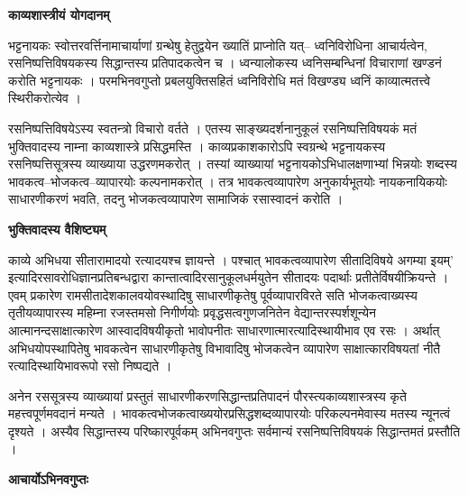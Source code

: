 \documentclass[10pt, a5paper, twoside]{article}
\newcommand{\customparagraph}[1]{
    \noindent \textbf{#1} \par
    \penalty 10000 %
    \vspace{0.1cm plus 0.05cm minus 0.02cm}
    \penalty 10000 %
}
\begin{document}
\customparagraph{\textbf{काव्यशास्त्रीयं योगदानम्}}

भट्टनायकः स्वोत्तरवर्त्तिनामाचार्याणां ग्रन्थेषु हेतुद्वयेन ख्यातिं प्राप्नोति यत्– ध्वनिविरोधिना आचार्यत्वेन, रसनिष्पत्तिविषयकस्य सिद्धान्तस्य प्रतिपादकत्वेन च । ध्वन्यालोकस्य ध्वनिसम्बन्धिनां  विचाराणां खण्डनं करोति भट्टनायकः । परमभिनवगुप्तो प्रबलयुक्तिसहितं ध्वनिविरोधि  मतं विखण्ड्य ध्वनिं काव्यात्मतत्त्वे स्थिरीकरोत्येव ।

रसनिष्पत्तिविषयेऽस्य स्वतन्त्रो विचारो वर्तते । एतस्य साङ्ख्यदर्शनानुकूलं रसनिष्पत्तिविषयकं मतं भुक्तिवादस्य नाम्ना काव्यशास्त्रे प्रसिद्धमस्ति । काव्यप्रकाशकारोऽपि स्वग्रन्थे भट्टनायकस्य रसनिष्पत्तिसूत्रस्य व्याख्याया उद्धरणमकरोत् । तस्यां व्याख्यायां भट्टनायकोऽभिधालक्षणाभ्यां भिन्नयोः शब्दस्य भावकत्व–भोजकत्व–व्यापारयोः कल्पनामकरोत् । तत्र भावकत्वव्यापारेण अनुकार्यभूतयोः नायकनायिकयोः साधारणीकरणं भवति, तदनु भोजकत्वव्यापारेण सामाजिकं  रसास्वादनं करोति ।

\customparagraph{\textbf{भुक्तिवादस्य वैशिष्ट्यम्}}

काव्ये अभिधया सीतारामादयो रत्यादयश्च ज्ञायन्ते । पश्चात् भावकत्वव्यापारेण सीतादिविषये अगम्या इयम्’ इत्यादिरसावरोधिज्ञानप्रतिबन्धद्वारा कान्तात्वादिरसानुकूलधर्मयुतेन सीतादयः पदार्थाः प्रतीतेर्विषयीक्रियन्ते । एवम् प्रकारेण रामसीतादेशकालवयोवस्थादिषु साधारणीकृतेषु पूर्वव्यापारविरते सति भोजकत्वाख्यस्य तृतीयव्यापारस्य महिम्ना रजस्तमसो निगीर्णयोः प्रवृद्धसत्वगुणजनितेन वेद्यान्तरस्पर्शशून्येन आत्मानन्दसाक्षात्कारेण आस्वादविषयीकृतो भावोपनीतः साधारणात्मारत्यादिस्थायीभाव एव रसः । अर्थात् अभिधयोपस्थापितेषु भावकत्वेन साधारणीकृतेषु विभावादिषु भोजकत्वेन व्यापारेण साक्षात्कारविषयतां नीतै रत्यादिस्थायिभावरूपो रसो निष्पद्यते ।

अनेन रससूत्रस्य व्याख्यायां प्रस्तुतं साधारणीकरणसिद्धान्तप्रतिपादनं पौरस्त्यकाव्यशास्त्रस्य कृते महत्त्वपूर्णमवदानं मन्यते । भावकत्वभोजकत्वाख्ययोरप्रसिद्धशब्दव्यापारयोः  परिकल्पनमेवास्य मतस्य न्यूनत्वं दृश्यते । अस्यैव सिद्धान्तस्य परिष्कारपूर्वकम् अभिनवगुप्तः सर्वमान्यं रसनिष्पत्तिविषयकं सिद्धान्तमतं प्रस्तौति ।

\customparagraph{\textbf{आचार्योऽभिनवगुप्तः}}
\end{document}
